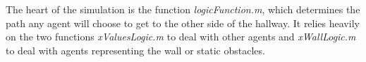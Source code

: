 
The heart of the simulation is the function \textit{logicFunction.m}, which determines the path any agent will choose to get to the other side of the hallway. It relies heavily on the two functions \textit{xValuesLogic.m} to deal with other agents and \textit{xWallLogic.m} to deal with agents representing the wall or static obstacles.\\


